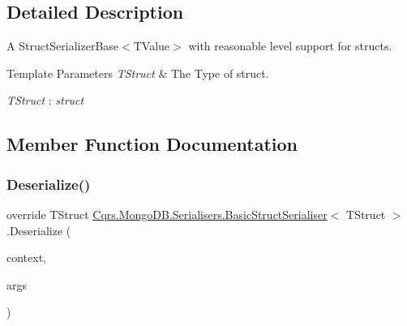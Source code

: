 \subsection{Detailed Description}
A Struct\+Serializer\+Base$<$\+T\+Value$>$ with reasonable level support for structs. 


\begin{DoxyTemplParams}{Template Parameters}
{\em T\+Struct} & The Type of struct.\\
\hline
\end{DoxyTemplParams}
\begin{Desc}
\item[Type Constraints]\begin{description}
\item[{\em T\+Struct} : {\em struct}]\end{description}
\end{Desc}


\subsection{Member Function Documentation}
\mbox{\label{classCqrs_1_1MongoDB_1_1Serialisers_1_1BasicStructSerialiser_ad27304148a7a67b6c86c277254108c95_ad27304148a7a67b6c86c277254108c95}} 
\subsubsection{\texorpdfstring{Deserialize()}{Deserialize()}}
{\footnotesize\ttfamily override T\+Struct \hyperlink{classCqrs_1_1MongoDB_1_1Serialisers_1_1BasicStructSerialiser}{Cqrs.\+Mongo\+D\+B.\+Serialisers.\+Basic\+Struct\+Serialiser}$<$ T\+Struct $>$.Deserialize (\begin{DoxyParamCaption}\item[{Bson\+Deserialization\+Context}]{context,  }\item[{Bson\+Deserialization\+Args}]{args }\end{DoxyParamCaption})}




